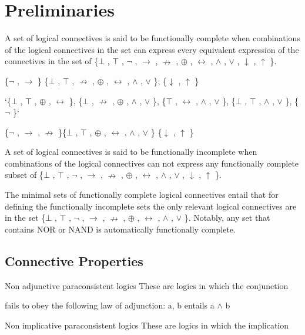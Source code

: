 \hypertarget{preliminaries}{%
\section{Preliminaries}\label{preliminaries}}

A set of logical connectives is said to be functionally complete when
combinations of the logical connectives in the set can express every
equivalent expression of the connectives in the set of \{$\bot$ , $\top$ , $\neg$ , $\to$ , $\nrightarrow$ ,
$\oplus$ , $\leftrightarrow$ , $\land$ , $\lor$ , $\downarrow$ , $\uparrow$ \}.

\{$\neg$ , $\to$ \} \{$\bot$ , $\top$ , $\nrightarrow$ , $\oplus$ , $\leftrightarrow$ , $\land$ , $\lor$ \}; \{$\downarrow$ , $\uparrow$ \}

`\{$\bot$ , $\top$ , $\oplus$ , $\leftrightarrow$ \}, \{$\bot$ , $\nrightarrow$ , $\oplus$ , $\land$ , $\lor$ \}, \{$\top$ , $\leftrightarrow$ , $\land$ , $\lor$ \}, \{$\bot$ , $\top$ , $\land$ , $\lor$ \},
\{$\neg$ \}`

\{$\neg$ , $\to$ , $\nrightarrow$ \}\{$\bot$ , $\top$ , $\oplus$ , $\leftrightarrow$ , $\land$ , $\lor$ \} \{$\downarrow$ , $\uparrow$ \}

A set of logical connectives is said to be functionally incomplete when
combinations of the logical connectives can not express any functionally
complete subset of \{$\bot$ , $\top$ , $\neg$ , $\to$ , $\nrightarrow$ , $\oplus$ , $\leftrightarrow$ , $\land$ , $\lor$ , $\downarrow$ , $\uparrow$ \}.

The minimal sets of functionally complete logical connectives entail
that for defining the functionally incomplete sets the only relevant
logical connectives are in the set \{$\bot$ , $\top$ , $\neg$ , $\to$ , $\nrightarrow$ , $\oplus$ , $\leftrightarrow$ , $\land$ , $\lor$ \}.
Notably, any set that contains NOR or NAND is automatically functionally
complete.

\hypertarget{connective-properties}{%
\subsection{Connective Properties}\label{connective-properties}}

Non adjunctive paraconsistent logics These are logics in which the
conjunction

fails to obey the following law of adjunction: a, b entails a $\land$  b

Non implicative paraconsistent logics These are logics in which the
implication


